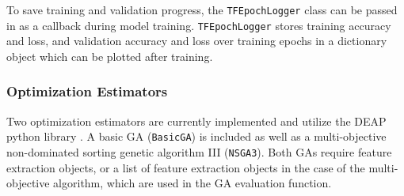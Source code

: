 To save training and validation progress, the \texttt{TFEpochLogger} class can be passed in as a callback during model training. \texttt{TFEpochLogger} stores training accuracy and loss, and validation accuracy and loss over training epochs in a dictionary object which can be plotted after training.

%
%
%
%
%
%

\subsubsection{Optimization Estimators}
Two optimization estimators are currently implemented and utilize the DEAP python library \cite{fortin2012deap}. A basic GA (\texttt{BasicGA}) is included as well as a multi-objective non-dominated sorting genetic algorithm III (\texttt{NSGA3}). Both GAs require feature extraction objects, or a list of feature extraction objects in the case of the multi-objective algorithm, which are used in the GA evaluation function. 

